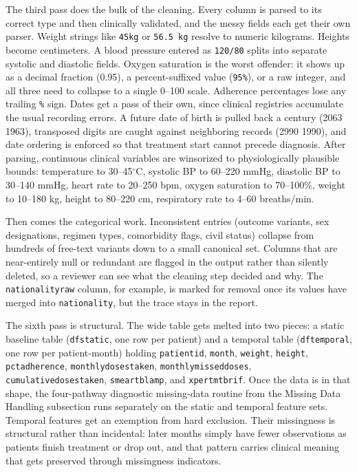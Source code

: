 \documentclass[12pt]{article}
\renewcommand{\_}{\textunderscore\allowbreak}
\begin{document}
The third pass does the bulk of the cleaning. Every column is parsed to its correct type and then clinically validated, and the messy fields each get their own parser. Weight strings like \texttt{45kg} or \texttt{56.5 kg} resolve to numeric kilograms. Heights become centimeters. A blood pressure entered as \texttt{120/80} splits into separate systolic and diastolic fields. Oxygen saturation is the worst offender: it shows up as a decimal fraction (0.95), a percent-suffixed value (\texttt{95\%}), or a raw integer, and all three need to collapse to a single 0--100 scale. Adherence percentages lose any trailing \texttt{\%} sign. Dates get a pass of their own, since clinical registries accumulate the usual recording errors. A future date of birth is pulled back a century (2063 \textrightarrow{} 1963), transposed digits are caught against neighboring records (2990 \textrightarrow{} 1990), and date ordering is enforced so that treatment start cannot precede diagnosis. After parsing, continuous clinical variables are winsorized to physiologically plausible bounds: temperature to 30--45$^\circ$C, systolic BP to 60--220 mmHg, diastolic BP to 30--140 mmHg, heart rate to 20--250 bpm, oxygen saturation to 70--100\%, weight to 10--180 kg, height to 80--220 cm, respiratory rate to 4--60 breaths/min.

Then comes the categorical work. Inconsistent entries (outcome variants, sex designations, regimen types, comorbidity flags, civil status) collapse from hundreds of free-text variants down to a small canonical set. Columns that are near-entirely null or redundant are flagged in the output rather than silently deleted, so a reviewer can see what the cleaning step decided and why. The \texttt{nationality\_raw} column, for example, is marked for removal once its values have merged into \texttt{nationality}, but the trace stays in the report.

The sixth pass is structural. The wide table gets melted into two pieces: a static baseline table (\texttt{df\_static}, one row per patient) and a temporal table (\texttt{df\_temporal}, one row per patient-month) holding \texttt{patient\_id}, \texttt{month}, \texttt{weight}, \texttt{height}, \texttt{pct\_adherence}, \texttt{monthly\_doses\_taken}, \texttt{monthly\_missed\_doses}, \texttt{cumulative\_doses\_taken}, \texttt{smear\_tb\_lamp}, and \texttt{xpert\_mtb\_rif}. Once the data is in that shape, the four-pathway diagnostic missing-data routine from the Missing Data Handling subsection runs separately on the static and temporal feature sets. Temporal features get an exemption from hard exclusion. Their missingness is structural rather than incidental: later months simply have fewer observations as patients finish treatment or drop out, and that pattern carries clinical meaning that gets preserved through missingness indicators.
\end{document}
